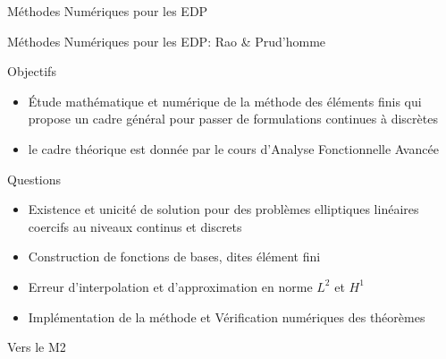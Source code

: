 \documentclass{beamer}
\begin{document}
\begin{frame}{Méthodes Numériques pour les EDP}




\end{frame}
\begin{frame}{Méthodes Numériques pour les EDP: Rao \& Prud'homme}
  \begin{block}{Objectifs}
    \begin{itemize}
    \item Étude mathématique et numérique de la méthode des éléments
      finis qui propose un cadre général pour passer de formulations
      continues à discrètes
    \item le cadre théorique est donnée par le cours d'Analyse
      Fonctionnelle Avancée
    \end{itemize}
  \end{block}
  \begin{block}{Questions}
    \begin{itemize}
    \item Existence et unicité de solution pour des problèmes
      elliptiques linéaires coercifs au niveaux continus et discrets
    \item Construction de fonctions de bases, dites élément fini
    \item Erreur d'interpolation et d'approximation en norme $L^2$ et $H^1$
    \item Implémentation de la méthode et Vérification numériques des théorèmes
    \end{itemize}
  \end{block}
\end{frame}

\begin{frame}{Vers le M2}

\end{frame}
\end{document}
